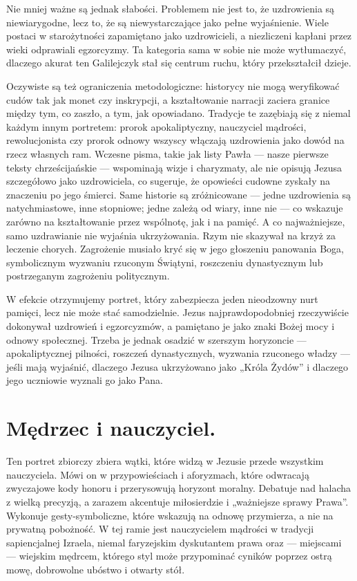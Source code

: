 Nie mniej ważne są jednak słabości.
Problemem nie jest to, że uzdrowienia są niewiarygodne, lecz to, że są niewystarczające jako pełne wyjaśnienie.
Wiele postaci w starożytności zapamiętano jako uzdrowicieli, a niezliczeni kapłani przez wieki odprawiali egzorcyzmy.
Ta kategoria sama w sobie nie może wytłumaczyć, dlaczego akurat ten Galilejczyk stał się centrum ruchu, który przekształcił dzieje.

Oczywiste są też ograniczenia metodologiczne: historycy nie mogą weryfikować cudów tak jak monet czy inskrypcji, a kształtowanie narracji zaciera granice między tym, co zaszło, a tym, jak opowiadano.
Tradycje te zazębiają się z niemal każdym innym portretem: prorok apokaliptyczny, nauczyciel mądrości, rewolucjonista czy prorok odnowy wszyscy włączają uzdrowienia jako dowód na rzecz własnych ram.
Wczesne pisma, takie jak listy Pawła — nasze pierwsze teksty chrześcijańskie — wspominają wizje i charyzmaty, ale nie opisują Jezusa szczegółowo jako uzdrowiciela, co sugeruje, że opowieści cudowne zyskały na znaczeniu po jego śmierci.
Same historie są zróżnicowane — jedne uzdrowienia są natychmiastowe, inne stopniowe; jedne zależą od wiary, inne nie — co wskazuje zarówno na kształtowanie przez wspólnotę, jak i na pamięć.
A co najważniejsze, samo uzdrawianie nie wyjaśnia ukrzyżowania.
Rzym nie skazywał na krzyż za leczenie chorych.
Zagrożenie musiało kryć się w jego głoszeniu panowania Boga, symbolicznym wyzwaniu rzuconym Świątyni, roszczeniu dynastycznym lub postrzeganym zagrożeniu politycznym.

W efekcie otrzymujemy portret, który zabezpiecza jeden nieodzowny nurt pamięci, lecz nie może stać samodzielnie.
Jezus najprawdopodobniej rzeczywiście dokonywał uzdrowień i egzorcyzmów, a pamiętano je jako znaki Bożej mocy i odnowy społecznej.
Trzeba je jednak osadzić w szerszym horyzoncie — apokaliptycznej pilności, roszczeń dynastycznych, wyzwania rzuconego władzy — jeśli mają wyjaśnić, dlaczego Jezusa ukrzyżowano jako „Króla Żydów” i dlaczego jego uczniowie wyznali go jako Pana.

\section{Mędrzec i nauczyciel.}\label{sec:teacher}

Ten portret zbiorczy zbiera wątki, które widzą w Jezusie przede wszystkim nauczyciela.
Mówi on w przypowieściach i aforyzmach, które odwracają zwyczajowe kody honoru i przerysowują horyzont moralny.
Debatuje nad halacha z wielką precyzją, a zarazem akcentuje miłosierdzie i „ważniejsze sprawy Prawa”.
Wykonuje gesty-symboliczne, które wskazują na odnowę przymierza, a nie na prywatną pobożność.
W tej ramie jest nauczycielem mądrości w tradycji sapiencjalnej Izraela, niemal faryzejskim dyskutantem prawa oraz — miejscami — wiejskim mędrcem, którego styl może przypominać cyników poprzez ostrą mowę, dobrowolne ubóstwo i otwarty stół.

